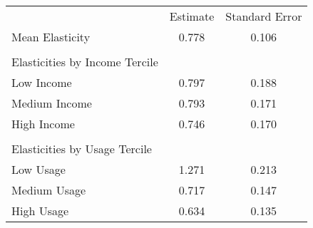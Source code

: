 \begin{tabular}{lcc}
& Estimate & Standard Error \\
Mean Elasticity &0.778&0.106\\
\hline
 & &  \\
Elasticities by Income Tercile & & \\
\hline
Low Income &0.797&0.188\\
Medium Income &0.793&0.171\\
High Income &0.746&0.170\\
 & &  \\
Elasticities by Usage Tercile & & \\
\hline
Low Usage &1.271&0.213\\
Medium Usage &0.717&0.147\\
High Usage &0.634&0.135\\
\hline
\end{tabular} 
